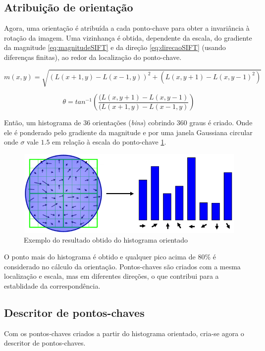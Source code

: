 \subsection*{Atribuição de orientação}

Agora, uma orientação é atribuída a cada ponto-chave para obter a invariância à rotação da imagem. 
Uma vizinhança é obtida, dependente da escala, do gradiente da magnitude \ref{eq:magnitudeSIFT} e da direção \ref{eq:direcaoSIFT} (usando diferenças finitas), ao redor da localização do ponto-chave. 

\begin{equation}
	m(x,y) = \sqrt{(L(x+1,y)-L(x-1,y))^2 + (L(x,y+1)-L(x,y-1)^2)}
	\label{eq:magnitudeSIFT}
\end{equation}

\begin{equation}
	\theta = tan^{-1} \left( \frac{(L(x,y+1)-L(x,y-1)}{(L(x+1,y)-L(x-1,y)}\right)
	\label{eq:direcaoSIFT}
\end{equation}

Então, um histograma de 36 orientações (\emph{bins}) cobrindo 360 graus é criado. Onde ele é ponderado pelo gradiente da magnitude e por uma janela Gaussiana circular onde $\sigma$ vale $1.5$ em relação à escala do ponto-chave \ref{fig:histogramaOrientado}.

\begin{figure} [!h]
	\centering
	\includegraphics[width=0.45\linewidth]{figs/histogramaOrientado.png}
	\caption{%
	Exemplo do resultado obtido do histograma orientado
	}\label{fig:histogramaOrientado}
\end{figure}

O ponto mais do histograma é obtido e qualquer pico acima de 80\% é considerado no cálculo da orientação. 
Pontos-chaves são criados com a mesma localização e escala, mas em diferentes direções, o que contribui para a establidade da correspondência.

\subsection*{Descritor de pontos-chaves}

Com os pontos-chaves criados a partir do histograma orientado, cria-se agora o descritor de pontos-chaves.

